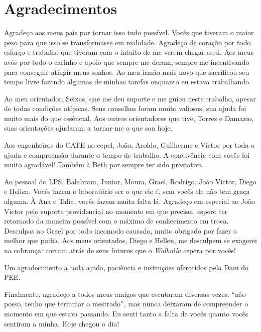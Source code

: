 \chapter*{Agradecimentos}

Agradeço aos meus pais por tornar isso tudo possível. Vocês que
tiveram o maior peso para que isso se transformasse em realidade.
Agradeço de coração por todo esforço e trabalho que tiveram com o
intuíto de me verem chegar aqui. Aos meus avós por todo o carinho e
apoio que sempre me deram, sempre me incentivando para conseguir
atingir meus sonhos. Ao meu irmão mais novo que sacríficou seu tempo
livre fazendo algumas de minhas tarefas enquanto eu estava
trabalhando.

Ao meu orientador, Seixas, que me deu suporte e me guiou neste
trabalho, apesar de todas condições atípicas. Seus conselhos foram
muito valiosos, sua ajuda foi muito mais do que essêncial. Aos outros
orientadores que tive, Torres e Damazio, suas orientações ajudaram a
tornar-me o que sou hoje.

Aos engenheiros do CATE no \acrlong{cepel}, João, Aroldo, Guilherme e
Victor por toda a ajuda e compreensão durante o tempo de trabalho. A
convivência com vocês foi muito agradável! Também à Beth por sempre
ter sido prestativa.

Ao pessoal do LPS, Balabram, Junior, Moura, Grael, Rodrigo, João
Victor, Diego e Hellen. Vocês fazem o laboratório ser o que ele é, sem
vocês ele não tem graça alguma. À Ana e Talia, vocês fazem muita falta
lá. Agradeço em especial ao João Victor pelo suporte providencial no
momento em que precisei, espero ter retornado da maneira possível com
o máximo de conhecimento em troca. Desculpas ao Grael por todo
incomodo causado, muito obrigado por fazer o melhor que podia. Aos
meus orientados, Diego e Hellen, me desculpem se exagerei na cobrança:
corram atrás de seus futuros que o \emph{Walhalla} espera por vocês!

Um agradecimento a toda ajuda, paciência e instruções oferecidos pela
Dani do PEE.

Finalmente, agradeço a todos meus amigos que escutaram diversas vezes:
``não posso, tenho que terminar o mestrado'', mas nunca deixaram de
compreender o momento em que estava passando. Eu senti tanto a falta
de vocês quanto vocês sentiram a minha. Hoje chegou o dia!


